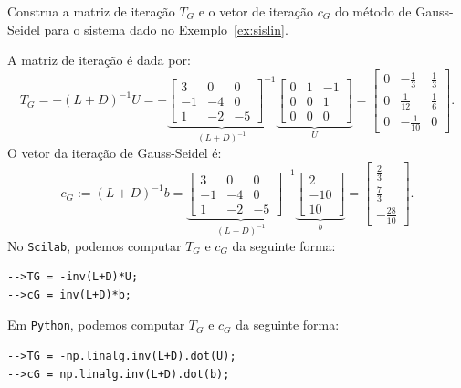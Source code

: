\begin{ex}
  Construa a matriz de iteração $T_G$ e o vetor de iteração $c_G$ do método de Gauss-Seidel para o sistema dado no Exemplo~\ref{ex:sislin}.
\end{ex}
\begin{sol}
  A matriz de iteração é dada por:
  \begin{equation}
    T_G = -(L+D)^{-1}U = -
     \underbrace{\begin{bmatrix}
      3 & 0 & 0\\
      -1 & -4 & 0\\
      1 & -2 & -5
    \end{bmatrix}^{-1}}_{(L + D)^{-1}}
  \underbrace{\begin{bmatrix}
    0 & 1 & -1\\
    0 & 0 & 1\\
    0 & 0 & 0
  \end{bmatrix}}_{U} =
\begin{bmatrix}
  0 & -\frac{1}{3} & \frac{1}{3}\\
  0 & \frac{1}{12} & \frac{1}{6}\\
  0 & -\frac{1}{10} & 0
\end{bmatrix}.
  \end{equation}
O vetor da iteração de Gauss-Seidel é:
\begin{equation}
  c_G := (L+D)^{-1}b =
    \underbrace{\begin{bmatrix}
      3 & 0 & 0\\
      -1 & -4 & 0\\
      1 & -2 & -5
    \end{bmatrix}^{-1}}_{(L + D)^{-1}}
    \underbrace{\begin{bmatrix}
      2\\
      -10\\
      10
    \end{bmatrix}}_{b} =
    \begin{bmatrix}
      \frac{2}{3}\\
      \frac{7}{3}\\
      -\frac{28}{10}
    \end{bmatrix}.
\end{equation}
\ifisscilab
No \verb+Scilab+, podemos computar $T_G$ e $c_G$ da seguinte forma:
\begin{verbatim}
-->TG = -inv(L+D)*U;
-->cG = inv(L+D)*b;
\end{verbatim}
\fi
\ifispython
Em \verb+Python+, podemos computar $T_G$ e $c_G$ da seguinte forma:
\begin{verbatim}
-->TG = -np.linalg.inv(L+D).dot(U);
-->cG = np.linalg.inv(L+D).dot(b);
\end{verbatim}
\fi
\end{sol}

